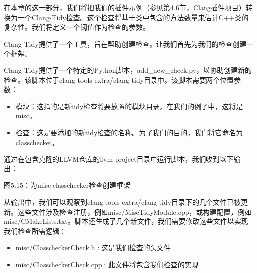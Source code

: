 
在本章的这一部分，我们将把我们的插件示例（参见第4.6节，Clang插件项目）转换为一个Clang-Tidy检查。这个检查将基于类中包含的方法数量来估计C++类的复杂性。我们将定义一个阈值作为检查的参数。

Clang-Tidy提供了一个工具，旨在帮助创建检查。让我们首先为我们的检查创建一个框架。


Clang-Tidy提供了一个特定的Python脚本，add\_new\_check.py，以协助创建新的检查。该脚本位于clang-tools-extra/clang-tidy目录中。该脚本需要两个位置参数：

\begin{itemize}
\item
模块：这指的是新tidy检查将要放置的模块目录。在我们的例子中，这将是misc。

\item
检查：这是要添加的新tidy检查的名称。为了我们的目的，我们将它命名为classchecker。
\end{itemize}

通过在包含克隆的LLVM仓库的llvm-project目录中运行脚本，我们收到以下输出：


\begin{center}
图5.15：为misc-classchecker检查创建框架
\end{center}

从输出中，我们可以观察到clang-tools-extra/clang-tidy目录下的几个文件已被更新。这些文件涉及检查注册，例如misc/MiscTidyModule.cpp，或构建配置，例如misc/CMakeLists.txt。脚本还生成了几个新文件，我们需要修改这些文件以实现我们检查所需逻辑：

\begin{itemize}
\item
misc/ClasscheckerCheck.h : 这是我们检查的头文件

\item
misc/ClasscheckerCheck.cpp : 此文件将包含我们检查的实现
\end{itemize}

